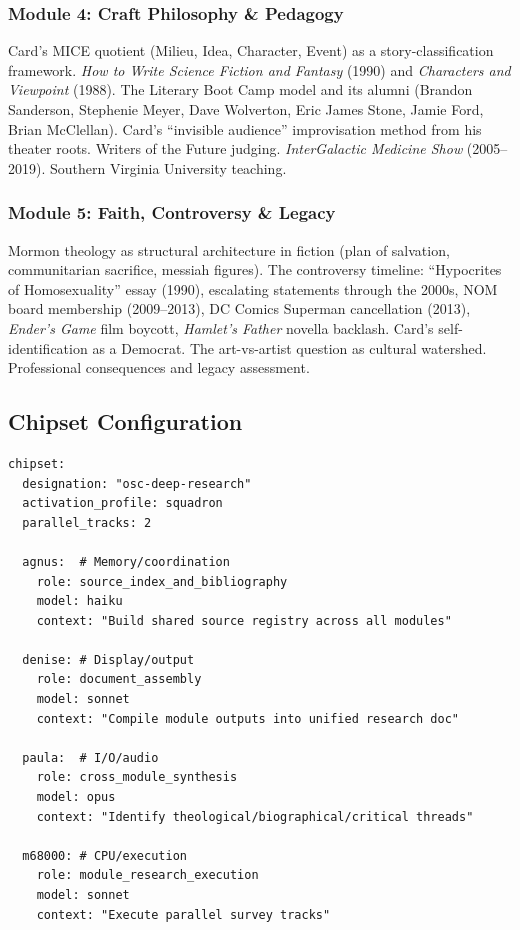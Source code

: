 \documentclass[11pt,letterpaper]{article}
\begin{document}
\subsubsection{Module 4: Craft Philosophy \& Pedagogy}

Card's MICE quotient (Milieu, Idea, Character, Event) as a story-classification framework. \textit{How to Write Science Fiction and Fantasy} (1990) and \textit{Characters and Viewpoint} (1988). The Literary Boot Camp model and its alumni (Brandon Sanderson, Stephenie Meyer, Dave Wolverton, Eric James Stone, Jamie Ford, Brian McClellan). Card's ``invisible audience'' improvisation method from his theater roots. Writers of the Future judging. \textit{InterGalactic Medicine Show} (2005--2019). Southern Virginia University teaching.

\subsubsection{Module 5: Faith, Controversy \& Legacy}

Mormon theology as structural architecture in fiction (plan of salvation, communitarian sacrifice, messiah figures). The controversy timeline: ``Hypocrites of Homosexuality'' essay (1990), escalating statements through the 2000s, NOM board membership (2009--2013), DC Comics Superman cancellation (2013), \textit{Ender's Game} film boycott, \textit{Hamlet's Father} novella backlash. Card's self-identification as a Democrat. The art-vs-artist question as cultural watershed. Professional consequences and legacy assessment.

\subsection{Chipset Configuration}

\begin{asciibox}
\begin{verbatim}
chipset:
  designation: "osc-deep-research"
  activation_profile: squadron
  parallel_tracks: 2

  agnus:  # Memory/coordination
    role: source_index_and_bibliography
    model: haiku
    context: "Build shared source registry across all modules"

  denise: # Display/output
    role: document_assembly
    model: sonnet
    context: "Compile module outputs into unified research doc"

  paula:  # I/O/audio
    role: cross_module_synthesis
    model: opus
    context: "Identify theological/biographical/critical threads"

  m68000: # CPU/execution
    role: module_research_execution
    model: sonnet
    context: "Execute parallel survey tracks"
\end{verbatim}
\end{asciibox}
\end{document}
